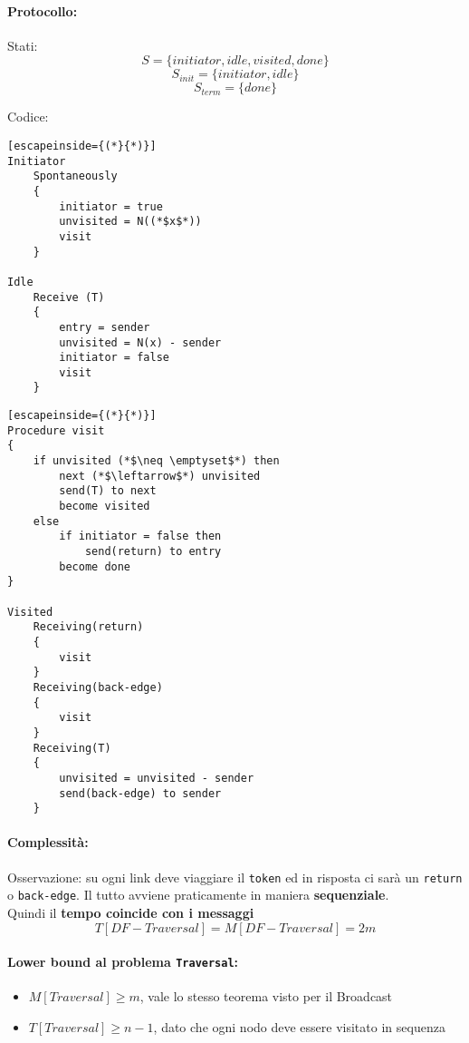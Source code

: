 \paragraph{Protocollo:} Stati:
$$ S = \{initiator, idle, visited, done\}$$
$$ S_{init} = \{initiator, idle\} $$
$$ S_{term} = \{done\}$$

Codice: 
\begin{lstlisting}[escapeinside={(*}{*)}]
Initiator
	Spontaneously
	{
		initiator = true
		unvisited = N((*$x$*))
		visit
	}
	
Idle
	Receive (T)
	{
		entry = sender
		unvisited = N(x) - sender
		initiator = false
		visit
	}
\end{lstlisting}
	
\newpage
	
\begin{lstlisting}[escapeinside={(*}{*)}]
Procedure visit
{
	if unvisited (*$\neq \emptyset$*) then 
		next (*$\leftarrow$*) unvisited
		send(T) to next
		become visited
	else 
		if initiator = false then 
			send(return) to entry
		become done
}

Visited
	Receiving(return)
	{
		visit
	}
	Receiving(back-edge)
	{
		visit
	}
	Receiving(T)
	{
		unvisited = unvisited - sender
		send(back-edge) to sender
	}
\end{lstlisting}

\paragraph{Complessità:} Osservazione: su ogni link deve viaggiare il \texttt{token} ed in risposta ci sarà un \texttt{return} o \texttt{back-edge}. Il tutto avviene praticamente in maniera \textbf{sequenziale}.\\

Quindi il \textbf{tempo coincide con i messaggi}
$$ T[DF-Traversal] = M[DF-Traversal] = 2m $$

\newpage

\paragraph{Lower bound al problema \texttt{Traversal}:}
\begin{itemize}
	\item $M[Traversal] \geq m$, vale lo stesso teorema visto per il Broadcast
	\item $T[Traversal] \geq n-1$, dato che ogni nodo deve essere visitato in sequenza
\end{itemize}


